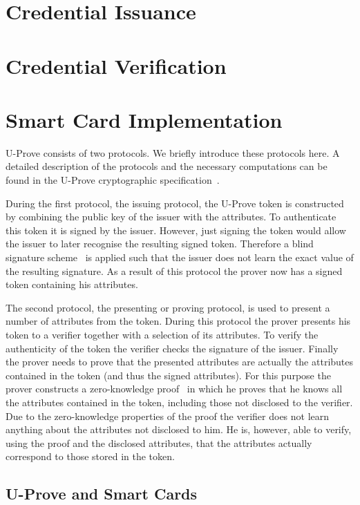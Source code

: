 \section{Credential Issuance}

\section{Credential Verification}

\section{Smart Card Implementation}

U-Prove consists of two protocols. We briefly introduce
these protocols here. A detailed description of the protocols and the necessary
computations can be found in the U-Prove cryptographic
specification~\cite{U-Prove_Crypto2010}.

During the first protocol, the issuing protocol, the U-Prove token is
constructed by combining the public key of the issuer with the attributes. To
authenticate this token it is signed by the issuer. However, just signing the
token would allow the issuer to later recognise the resulting signed token.
Therefore a blind signature scheme~\cite{Chaum1983} is applied such that the
issuer does not learn the exact value of the resulting signature. As a result of
this protocol the prover now has a signed token containing his attributes.

The second protocol, the presenting or proving protocol, is used to present a
number of attributes from the token. During this protocol the prover presents
his token to a verifier together with a selection of its attributes. To verify
the authenticity of the token the verifier checks the signature of the issuer.
Finally the prover needs to prove that the presented attributes are actually the
attributes contained in the token (and thus the signed attributes). For this
purpose the prover constructs a zero-knowledge proof~\cite{FiatShamir1986} in
which he proves that he knows all the attributes contained in the token,
including those not disclosed to the verifier. Due to the zero-knowledge
properties of the proof the verifier does not learn anything about the
attributes not disclosed to him. He is, however, able to verify, using the proof
and the disclosed attributes, that the attributes actually correspond to those
stored in the token.

\subsection{U-Prove and Smart Cards}\label{sec:uproveandcards}

